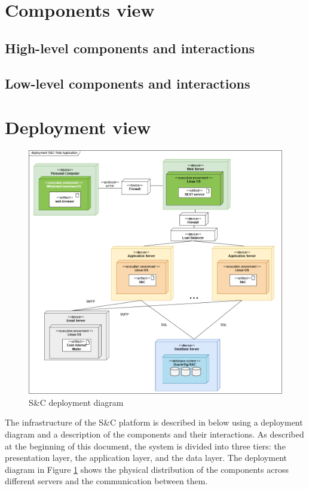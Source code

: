 \section{Components view}\label{sec:components view}
\subsection{High-level components and interactions}\label{subsec:high-level components and interactions}
\subsection{Low-level components and interactions}\label{subsec:low-level components and interactions}

\section{Deployment view}\label{sec:deployment view}
\begin{figure}
    \centering
    \includegraphics[width=1\textwidth]{Images/DeploymentView.drawio.png}
    \caption{S\&C deployment diagram}\label{fig:deployment_diagram}
\end{figure}
The infrastructure of the S\&C platform is described in below using a deployment diagram and a description of the components and their interactions.
As described at the beginning of this document, the system is divided into three tiers: the presentation layer, the application layer, and the data layer.
The deployment diagram in Figure \ref{fig:deployment_diagram} shows the physical distribution of the components across different servers and the communication
between them.

